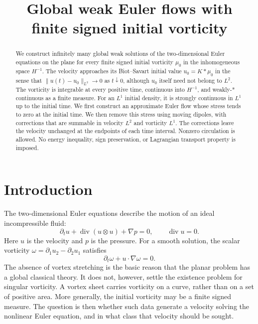 \documentclass[11pt,a4paper,reqno]{amsart}
\title[Weak Euler flows with signed initial vorticity]{Global weak Euler flows with\\
finite signed initial vorticity}
\date{}
\theoremstyle{plain}
\theoremstyle{definition}
\theoremstyle{remark}
\numberwithin{equation}{section}
\newcommand{\Div}{\operatorname{div}}
\begin{document}
\begin{abstract}
We construct infinitely many global weak solutions of the
two-dimensional Euler equations on the plane for every finite signed
initial vorticity $\mu_0$ in the inhomogeneous space $H^{-1}$. The
velocity approaches its Biot--Savart initial value $u_0=K*\mu_0$ in
the sense that $\|u(t)-u_0\|_{L^2}\to0$ as $t\downarrow0$, although
$u_0$ itself need not belong to $L^2$. The vorticity is integrable at
every positive time, continuous into $H^{-1}$, and weakly-* continuous
as a finite measure. For an $L^1$ initial density, it is strongly
continuous in $L^1$ up to the initial time. We first construct an
approximate Euler flow whose stress tends to zero at the initial
time. We then remove this stress using moving dipoles, with
corrections that are summable in velocity $L^2$ and vorticity $L^1$.
The corrections leave the velocity unchanged at the endpoints of each
time interval. Nonzero circulation is allowed. No energy inequality,
sign preservation, or Lagrangian transport property is imposed.
\end{abstract}

\maketitle

\section{Introduction}\label{sec:intro}

The two-dimensional Euler equations describe the motion of an ideal
incompressible fluid:
\begin{equation}\label{eq:euler-intro}
 \partial_tu+\Div(u\otimes u)+\nabla p=0,
 \qquad \Div u=0.
\end{equation}
Here $u$ is the velocity and $p$ is the pressure. For a smooth solution,
the scalar vorticity $\omega=\partial_1u_2-\partial_2u_1$ satisfies
\[
 \partial_t\omega+u\cdot\nabla\omega=0.
\]
The absence of vortex stretching is the basic reason that the planar
problem has a global classical theory. It does not, however, settle the
existence problem for singular vorticity. A vortex sheet carries
vorticity on a curve, rather than on a set of positive area. More
generally, the initial vorticity may be a finite signed measure. The
question is then whether such data generate a velocity solving the
nonlinear Euler equation, and in what class that velocity should be
sought.
\end{document}
